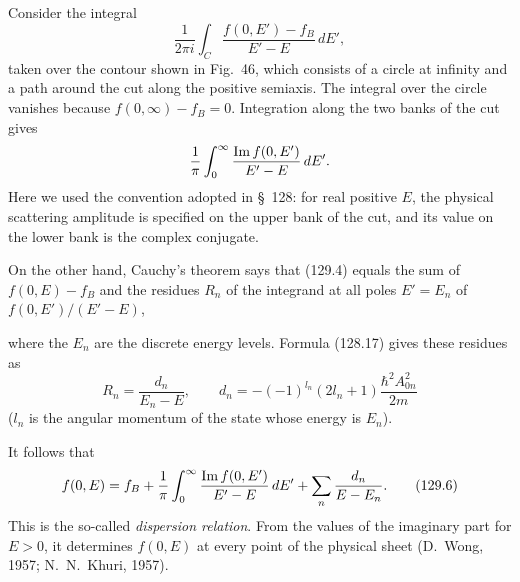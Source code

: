 Consider the integral
\begin{equation}
 \frac1{2\pi i}\int_C\frac{f(0,E')-f_B}{E'-E}\,dE',
 \tag{129.4}
\end{equation}
taken over the contour shown in Fig.~46, which consists of a circle at
infinity and a path around the cut along the positive semiaxis. The integral
over the circle vanishes because $f(0,\infty)-f_B=0$. Integration along the
two banks of the cut gives
\[
 \frac1\pi\int_0^\infty\frac{\mathop{\rm Im}f(0,E')}{E'-E}\,dE'.
\]
Here we used the convention adopted in \S~128: for real positive $E$, the
physical scattering amplitude is specified on the upper bank of the cut, and
its value on the lower bank is the complex conjugate.

\begin{figure}[htbp]
\centering
{}
\caption{}
\label{fig:46}
\end{figure}

On the other hand, Cauchy's theorem says that (129.4) equals the sum of
$f(0,E)-f_B$ and the residues $R_n$ of the integrand at all poles $E'=E_n$ of
$f(0,E')/(E'-E)$,

where the $E_n$ are the discrete energy levels. Formula (128.17) gives these
residues as
\begin{equation}
 R_n=\frac{d_n}{E_n-E},\qquad
 d_n=-(-1)^{l_n}(2l_n+1)\frac{\hbar^2A_{0n}^2}{2m}
 \tag{129.5}
\end{equation}
($l_n$ is the angular momentum of the state whose energy is $E_n$).

It follows that
\begin{equation}
 f(0,E)=f_B+\frac1\pi\int_0^\infty\frac{\mathop{\rm Im}f(0,E')}{E'-E}\,dE'
 +\sum_n\frac{d_n}{E-E_n}.
 \tag{129.6}
\end{equation}
This is the so-called \emph{dispersion relation}. From the values of the
imaginary part for $E>0$, it determines $f(0,E)$ at every point of the
physical sheet (D.~Wong, 1957; N.~N.~Khuri, 1957).

